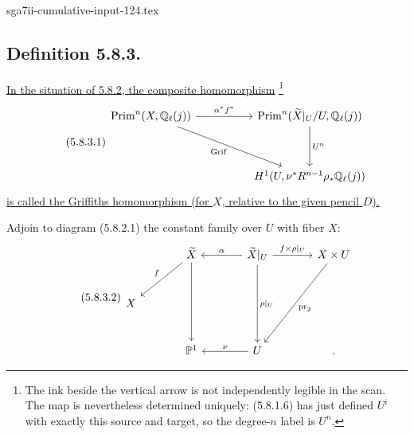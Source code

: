 \begin{filecontents*}{sga7ii-cumulative-input-124.tex}
\subsection*{Definition 5.8.3.}
\underline{In the situation of 5.8.2, the composite homomorphism}
\footnote{The ink beside the vertical arrow is not independently legible in
the scan.  The map is nevertheless determined uniquely: (5.8.1.6) has just
defined $U^i$ with exactly this source and target, so the degree-$n$ label is
$U^n$.}
\begin{equation}\tag{5.8.3.1}
\begin{tikzcd}[column sep=huge,row sep=huge]
\operatorname{Prim}^n(X,\mathbb Q_\ell(j))
  \arrow[r,"\alpha^*f^*"]
  \arrow[dr,"\operatorname{Grif}"']
&
\operatorname{Prim}^n(\widetilde X|_U/U,\mathbb Q_\ell(j))
  \arrow[d,"U^n"]
\\
{}
&
H^1(U,\nu^*R^{n-1}\rho_*\mathbb Q_\ell(j))
\end{tikzcd}
\end{equation}
\underline{is called the Griffiths homomorphism (for $X$, relative to the
given pencil $D$).}

Adjoin to diagram (5.8.2.1) the constant family over $U$ with fiber $X$:
\begin{equation}\tag{5.8.3.2}
\begin{tikzcd}[row sep=large,column sep=large]
{}
&
\widetilde X
  \arrow[dl,"f"']
  \arrow[dd]
&
\widetilde X|_U
  \arrow[l,"\alpha"']
  \arrow[r,"f\times\rho|_U"]
  \arrow[dd,"\rho|_U"]
&
X\times U
  \arrow[ddl,"\operatorname{pr}_2"]
\\
X&{}&{}&{}
\\
{}
&
\mathbb P^1
&
U\arrow[l,"\nu"']
&
.
\end{tikzcd}
\end{equation}

\end{filecontents*}
